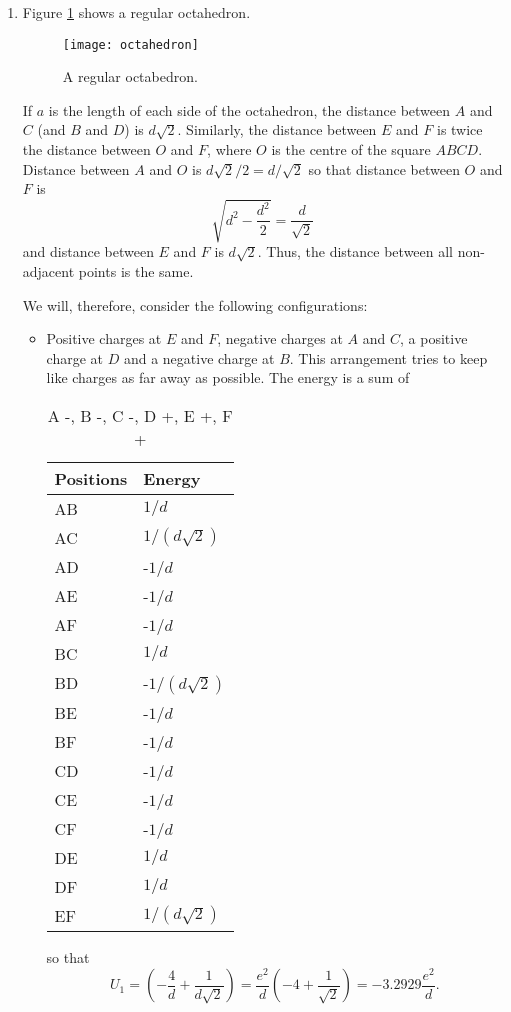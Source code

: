\documentclass{article}
\begin{document}
\begin{enumerate}
\item Figure \ref{c1f3} shows a regular octahedron.
\begin{figure}
\center
\texttt{[image: octahedron]}
\caption{A regular octabedron.}
\label{c1f3}
\end{figure}
If $a$ is the length of each side of the octahedron, the distance between $A$ and $C$
(and $B$ and $D$) is $d\sqrt{2}$. Similarly, the distance between $E$ and $F$ is
twice the distance between $O$ and $F$, where $O$ is the centre of the square $ABCD$.
Distance between $A$ and $O$ is $d\sqrt{2}/2 = d/\sqrt{2}$ so that distance 
between $O$ and $F$ is
\[
\sqrt{d^2 - \frac{d^2}{2}} = \frac{d}{\sqrt{2}}
\]
and distance between $E$ and $F$ is $d\sqrt{2}$. Thus, the distance between all 
non-adjacent points is the same.

We will, therefore, consider the following configurations:
\begin{itemize}
\item Positive charges at $E$ and $F$, negative charges at $A$ and $C$, a positive
charge at $D$ and a negative charge at $B$. This arrangement tries to keep like 
charges as far away as possible. The energy is a sum of
\begin{table}[ht!]
\center
\begin{tabular}{ll}
Positions & Energy  \\
\hline
AB & $1/d$ \\
AC & $1/(d\sqrt{2})$ \\
AD & -$1/d$ \\
AE & -$1/d$ \\
AF & -$1/d$ \\
BC & $1/d$ \\
BD & -$1/(d\sqrt{2})$ \\
BE & -$1/d$ \\
BF & -$1/d$ \\
CD & -$1/d$ \\
CE & -$1/d$ \\
CF & -$1/d$ \\
DE & $1/d$ \\
DF & $1/d$ \\
EF & $1/(d\sqrt{2})$
\end{tabular}
\caption{A -, B -, C -, D +, E +, F +}
\end{table}
so that
\[
U_1 = \left(-\frac{4}{d} + \frac{1}{d\sqrt{2}}\right) = \frac{e^2}{d}\left(-4 + \frac{1}{\sqrt{2}}\right)
= -3.2929\frac{e^2}{d}.
\]


\end{itemize}
\end{enumerate}
\end{document}
